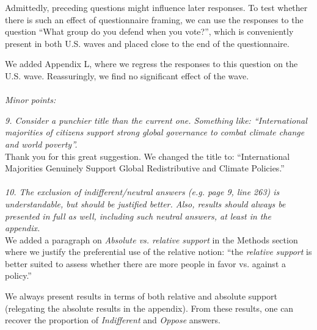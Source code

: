 \documentclass[12pt,english]{article}
\begin{document}
Admittedly, preceding questions might influence later responses. To test whether there is such an effect of questionnaire framing, we can use the responses to the question ``What group do you defend when you vote?'', which is conveniently present in both U.S. waves and placed close to the end of the questionnaire. 

We added Appendix L, where we regress the responses to this question on the U.S. wave. Reassuringly, we find no significant effect of the wave.
~\\ ~\\

\textit{Minor points:}

\textit{9. Consider a punchier title than the current one. Something like: “International majorities of citizens support strong global governance to combat climate change and world poverty”.}~\\

Thank you for this great suggestion. We changed the title to: ``International Majorities Genuinely Support Global Redistributive and Climate Policies.'' 
~\\ ~\\

\textit{10. The exclusion of indifferent/neutral answers (e.g. page 9, line 263) is understandable, but should be justified better. Also, results should always be presented in full as well, including such neutral answers, at least in the appendix.}~\\ %

We added a paragraph on \textit{Absolute vs. relative support} in the Methods section where we justify the preferential use of the relative notion: ``the \textit{relative support} is better suited to assess whether there are more people in favor vs. against a policy.''

We always present results in terms of both relative and absolute support (relegating the absolute results in the appendix). From these results, one can recover the proportion of \textit{Indifferent} and \textit{Oppose} answers. 
~\\ ~\\
\end{document}
